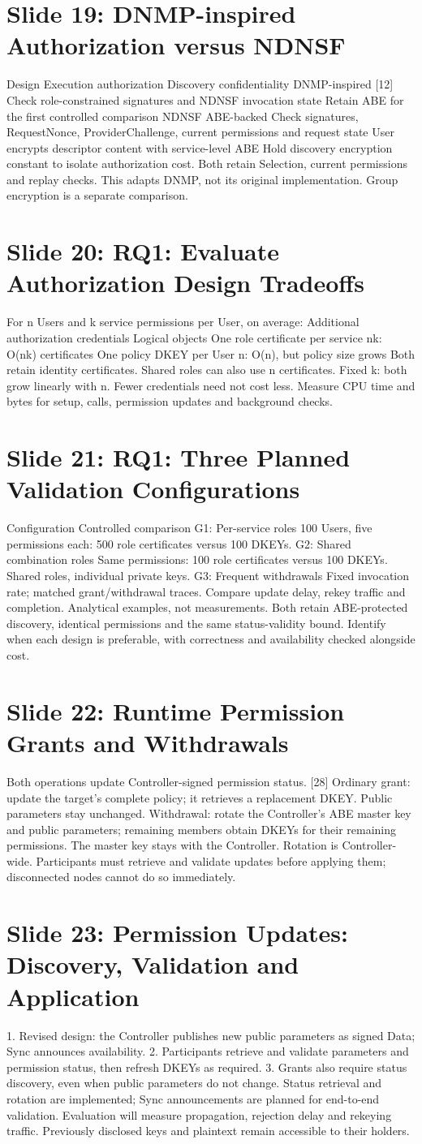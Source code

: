 \documentclass[11pt]{article}
\newcommand{\slideentry}[3]{\section*{Slide #1: #2}#3\par}
\begin{document}
\slideentry{19}{DNMP-inspired Authorization versus NDNSF}{
Design Execution authorization Discovery confidentiality DNMP-inspired [12] Check role-constrained signatures and NDNSF invocation state Retain ABE for the first controlled comparison NDNSF ABE-backed Check signatures, RequestNonce, ProviderChallenge, current permissions and request state User encrypts descriptor content with service-level ABE Hold discovery encryption constant to isolate authorization cost. Both retain Selection, current permissions and replay checks. This adapts DNMP, not its original implementation. Group encryption is a separate comparison.
}
\slideentry{20}{RQ1: Evaluate Authorization Design Tradeoffs}{
For n Users and k service permissions per User, on average: Additional authorization credentials Logical objects One role certificate per service nk: O(nk) certificates One policy DKEY per User n: O(n), but policy size grows Both retain identity certificates. Shared roles can also use n certificates. Fixed k: both grow linearly with n. Fewer credentials need not cost less. Measure CPU time and bytes for setup, calls, permission updates and background checks.
}
\slideentry{21}{RQ1: Three Planned Validation Configurations}{
Configuration Controlled comparison G1: Per-service roles 100 Users, five permissions each: 500 role certificates versus 100 DKEYs. G2: Shared combination roles Same permissions: 100 role certificates versus 100 DKEYs. Shared roles, individual private keys. G3: Frequent withdrawals Fixed invocation rate; matched grant/withdrawal traces. Compare update delay, rekey traffic and completion. Analytical examples, not measurements. Both retain ABE-protected discovery, identical permissions and the same status-validity bound. Identify when each design is preferable, with correctness and availability checked alongside cost.
}
\slideentry{22}{Runtime Permission Grants and Withdrawals}{
Both operations update Controller-signed permission status. [28] Ordinary grant: update the target’s complete policy; it retrieves a replacement DKEY. Public parameters stay unchanged. Withdrawal: rotate the Controller’s ABE master key and public parameters; remaining members obtain DKEYs for their remaining permissions. The master key stays with the Controller. Rotation is Controller-wide. Participants must retrieve and validate updates before applying them; disconnected nodes cannot do so immediately.
}
\slideentry{23}{Permission Updates: Discovery, Validation and Application}{
1. Revised design: the Controller publishes new public parameters as signed Data; Sync announces availability. 2. Participants retrieve and validate parameters and permission status, then refresh DKEYs as required. 3. Grants also require status discovery, even when public parameters do not change. Status retrieval and rotation are implemented; Sync announcements are planned for end-to-end validation. Evaluation will measure propagation, rejection delay and rekeying traffic. Previously disclosed keys and plaintext remain accessible to their holders.
}
\end{document}
